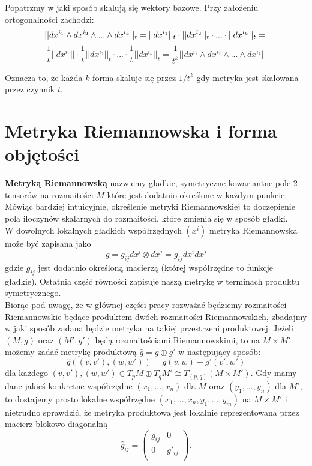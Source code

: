 \documentclass[licencjacka]{pracamgr}
\theoremstyle{definition}
\theoremstyle{definition}
\theoremstyle{plain}
\theoremstyle{plain}
\theoremstyle{plain}
\theoremstyle{plain}
\begin{document}
Popatrzmy w jaki sposób skalują się wektory bazowe. Przy założeniu ortogonalności
zachodzi:
\[
    ||dx^{i_1} \wedge dx^{i_2} \wedge ... \wedge dx^{i_k} ||_t =  
    ||dx^{i_1} ||_t \cdot ||  dx^{i_2} ||_t \cdot ... \cdot || dx^{i_k} ||_t =  \\
\]
\[
    \frac{1}{t}||dx^{i_1} || \cdot \frac{1}{t} ||  dx^{i_2} ||_t \cdot ...
     \cdot \frac{1}{t} || dx^{i_k} ||_t = 
    \frac{1}{t^k}||dx^{i_1} \wedge dx^{i_2} \wedge ... \wedge dx^{i_k} ||
\]

Oznacza to, że każda $k$ forma skaluje się przez $1/t^k$ gdy metryka
jest skalowana przez czynnik $t$.

\section{Metryka Riemannowska i forma objętości}

\textbf{Metryką Riemannowską} nazwiemy gładkie, symetryczne kowariantne
pole 2-tensorów na rozmaitości
$M$ które jest dodatnio określone w każdym punkcie. Mówiąc bardziej
intuicyjnie, określenie metryki Riemannowskiej to doczepienie 
pola iloczynów skalarnych do rozmaitości, które zmienia się w sposób gładki.
\\

W dowolnych lokalnych gładkich współrzędnych $(x^i)$ metryka Riemannowska
może być zapisana jako
\[ %
    g = g_{ij} dx^i \otimes dx^j = g_{ij} dx^i dx^j
\]
gdzie
$g_{ij}$
jest dodatnio określoną macierzą (której współrzędne to funkcje gładkie). Ostatnia
część równości zapisuje naszą metrykę w terminach produktu symetrycznego. \\

Biorąc pod uwagę, że w głównej części pracy rozważać będziemy
rozmaitości Riemannowskie będące produktem dwóch rozmaitości
Riemannowskich, zbadajmy w jaki sposób zadana będzie metryka na takiej
przestrzeni produktowej. Jeżeli $(M, g)$ oraz $(M', g')$ będą rozmaitościami
Riemannowskimi, to na $M \times M'$ możemy zadać metrykę produktową
 $\hat g = g \oplus g'$ w następujący sposób:
\[
\hat g
 \left( (v, v'), (w, w') \right) =
 g(v, w) + g'(v', w')
\]
dla każdego
 $(v, v'), (w, w') \in T_p M \oplus T_q M' \cong T_{(p, q)} (M \times M')$.
Gdy mamy dane jakieś konkretne współrzędne $(x_1, ... , x_n)$ dla $M$ oraz
$(y_1, ..., y_n)$ dla $M'$, to dostajemy prosto lokalne współrzędne
$(x_1, ..., x_n, y_1, ..., y_m)$ na $M \times M'$ i nietrudno sprawdzić, 
że metryka produktowa jest lokalnie reprezentowana przez macierz blokowo diagonalną
\[
  \hat g_{ij}  = 
  \left(
    \begin{array}{cc}
     g_{ij}   &  0 \\
      0      & g'_{ij} \\
      \end{array}
  \right).
\] \\
\end{document}
